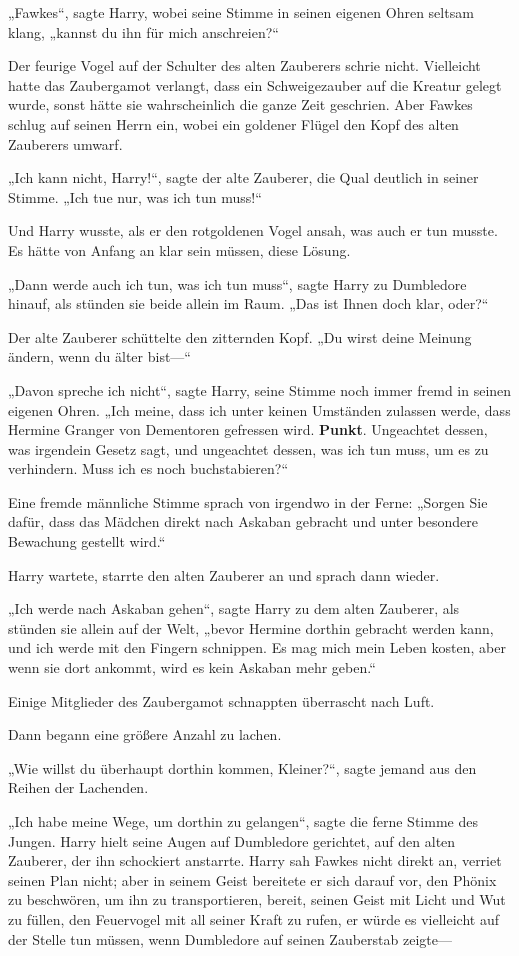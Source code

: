 {„Fawkes“, sagte Harry, wobei seine Stimme in seinen eigenen Ohren seltsam klang, „kannst du ihn für mich anschreien?“

Der feurige Vogel auf der Schulter des alten Zauberers schrie nicht. Vielleicht hatte das Zaubergamot verlangt, dass ein Schweigezauber auf die Kreatur gelegt wurde, sonst hätte sie wahrscheinlich die ganze Zeit geschrien. Aber Fawkes schlug auf seinen Herrn ein, wobei ein goldener Flügel den Kopf des alten Zauberers umwarf.

„Ich kann nicht, Harry!“, sagte der alte Zauberer, die Qual deutlich in seiner Stimme. „Ich tue nur, was ich tun muss!“

Und Harry wusste, als er den rotgoldenen Vogel ansah, was auch er tun musste. Es hätte von Anfang an klar sein müssen, diese Lösung.

„Dann werde auch ich tun, was ich tun muss“, sagte Harry zu Dumbledore hinauf, als stünden sie beide allein im Raum. „Das ist Ihnen doch klar, oder?“

Der alte Zauberer schüttelte den zitternden Kopf. „Du wirst deine Meinung ändern, wenn du älter bist—“

„Davon spreche ich nicht“, sagte Harry, seine Stimme noch immer fremd in seinen eigenen Ohren. „Ich meine, dass ich unter keinen Umständen zulassen werde, dass Hermine Granger von Dementoren gefressen wird. \textbf{Punkt}. Ungeachtet dessen, was irgendein Gesetz sagt, und ungeachtet dessen, was ich tun muss, um es zu verhindern. Muss ich es noch buchstabieren?“

Eine fremde männliche Stimme sprach von irgendwo in der Ferne: „Sorgen Sie dafür, dass das Mädchen direkt nach Askaban gebracht und unter besondere Bewachung gestellt wird.“

Harry wartete, starrte den alten Zauberer an und sprach dann wieder.

„Ich werde nach Askaban gehen“, sagte Harry zu dem alten Zauberer, als stünden sie allein auf der Welt, „bevor Hermine dorthin gebracht werden kann, und ich werde mit den Fingern schnippen. Es mag mich mein Leben kosten, aber wenn sie dort ankommt, wird es kein Askaban mehr geben.“

Einige Mitglieder des Zaubergamot schnappten überrascht nach Luft.

Dann begann eine größere Anzahl zu lachen.

„Wie willst du überhaupt dorthin kommen, Kleiner?“, sagte jemand aus den Reihen der Lachenden.

„Ich habe meine Wege, um dorthin zu gelangen“, sagte die ferne Stimme des Jungen. Harry hielt seine Augen auf Dumbledore gerichtet, auf den alten Zauberer, der ihn schockiert anstarrte. Harry sah Fawkes nicht direkt an, verriet seinen Plan nicht; aber in seinem Geist bereitete er sich darauf vor, den Phönix zu beschwören, um ihn zu transportieren, bereit, seinen Geist mit Licht und Wut zu füllen, den Feuervogel mit all seiner Kraft zu rufen, er würde es vielleicht auf der Stelle tun müssen, wenn Dumbledore auf seinen Zauberstab zeigte—

}
